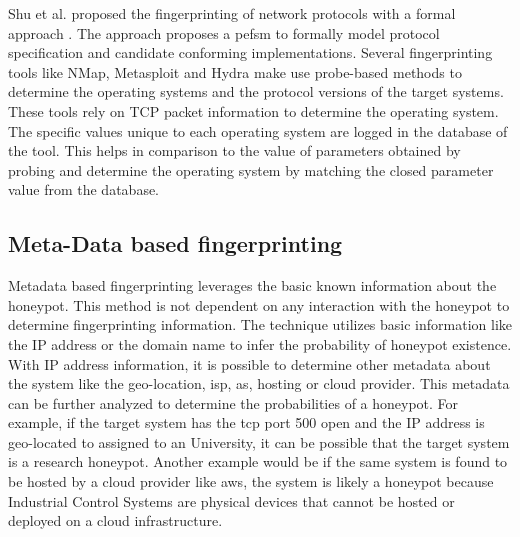Shu et al.  proposed the fingerprinting of network protocols with a formal approach \cite{shu2006network}. The approach proposes a \acrfull{pefsm} to formally model protocol specification and candidate conforming implementations. Several fingerprinting tools like NMap, Metasploit and Hydra make use probe-based methods to determine the operating systems and the protocol versions of the target systems. These tools rely on TCP packet information to determine the operating system. The specific values unique to each operating system are logged in the database of the tool. This helps in comparison to the value of parameters obtained by probing and determine the operating system by matching the closed parameter value from the database.

\subsection{Meta-Data based fingerprinting}
Metadata based fingerprinting leverages the basic known information about the honeypot. This method is  not dependent on any interaction with the honeypot to determine fingerprinting information. The technique utilizes basic information like the IP address or the domain name to infer the probability of honeypot existence. With IP address information, it is possible to determine other metadata about the system like the geo-location, \acrshort{isp}, \acrshort{as}, hosting or cloud provider. This metadata can be further analyzed to determine the probabilities of a honeypot. For example, if the target system has the \acrshort{tcp} port 500 open and the IP address is geo-located to assigned to an University, it can be possible that the target system is a research honeypot. Another example would be if the same system is found to be hosted by a cloud provider like \acrshort{aws}, the system is likely a honeypot because Industrial Control Systems are physical devices that cannot be hosted or deployed on a cloud infrastructure.

